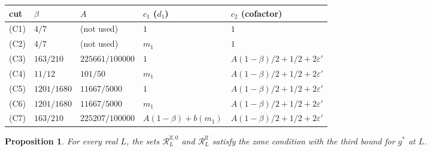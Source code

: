 \documentclass[11pt]{article}
\newtheorem{proposition}[theorem]{Proposition}
\theoremstyle{definition}
\begin{document}
\begin{center}
\small\setlength{\tabcolsep}{4pt}
\begin{tabular}{@{}lllll@{}}
\toprule
cut & $\beta$ & $A$ & $c_1$ ($d_1$) & $c_2$ (cofactor) \\
\midrule
(C1) & $4/7$ & (not used) & $1$ & $1$ \\
(C2) & $4/7$ & (not used) & $m_1$ & $1$ \\
(C3) & $163/210$ & $225661/100000$ & $1$ & $A(1 - \beta)/2 + 1/2 + 2\varepsilon'$ \\
(C4) & $11/12$ & $101/50$ & $m_1$ & $A(1 - \beta)/2 + 1/2 + 2\varepsilon'$ \\
(C5) & $1201/1680$ & $11667/5000$ & $1$ & $A(1 - \beta)/2 + 1/2 + 2\varepsilon'$ \\
(C6) & $1201/1680$ & $11667/5000$ & $m_1$ & $A(1 - \beta)/2 + 1/2 + 2\varepsilon'$ \\
(C7) & $163/210$ & $225207/100000$ & $A(1 - \beta) + b(m_1)$ & $A(1 - \beta)/2 + 1/2 + 2\varepsilon'$ \\
\bottomrule
\end{tabular}
\end{center}

\begin{proposition}\label{prop:leaf-zone}
For every real $L$, the sets $\mathcal R^{\mathrm{lf},0}_L$ and $\mathcal R^{\mathrm{lf}}_L$ satisfy the zone condition
with the third bound for $g^*$ at $L$.
\end{proposition}
\end{document}
